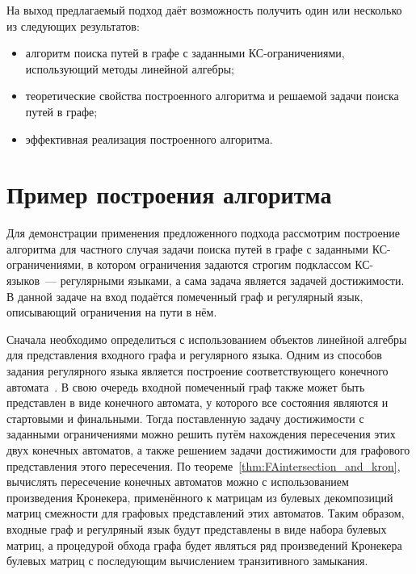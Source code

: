 На выход предлагаемый подход даёт возможность получить один или несколько из следующих результатов:
\begin{itemize}
    \item алгоритм поиска путей в графе с заданными КС-ограничениями, использующий методы линейной алгебры;
    \item теоретические свойства построенного алгоритма и решаемой задачи поиска путей в графе;
    \item эффективная реализация построенного алгоритма.
\end{itemize}

\section{Пример построения алгоритма}\label{sec:ch2/sec2}
Для демонстрации применения предложенного подхода рассмотрим построение алгоритма для частного случая задачи поиска путей в графе с заданными КС-ограничениями, в котором ограничения задаются строгим подклассом КС-языков~--- регулярными языками, а сама задача является задачей достижимости. В данной задаче на вход подаётся помеченный граф и регулярный язык, описывающий ограничения на пути в нём.

Сначала необходимо определиться с использованием объектов линейной алгебры для представления входного графа и регулярного языка. Одним из способов задания регулярного языка является построение соответствующего конечного автомата~\cite{hopcroft2001introduction}. В свою очередь входной помеченный граф также может быть представлен в виде конечного автомата, у которого все состояния являются и стартовыми и финальными. Тогда поставленную задачу достижимости с заданными ограничениями можно решить путём нахождения пересечения этих двух конечных автоматов, а также решением задачи достижимости для графового представления этого пересечения. По теореме~\ref{thm:FAintersection_and_kron}, вычислять пересечение конечных автоматов можно с использованием произведения Кронекера, применённого к матрицам из булевых декомпозиций матриц смежности для графовых представлений этих автоматов. Таким образом, входные граф и регулряный язык будут представлены в виде набора булевых матриц, а процедурой обхода графа будет являться ряд произведений Кронекера булевых матриц с последующим вычислением транзитивного замыкания.

